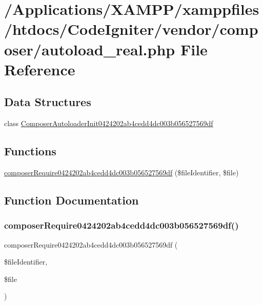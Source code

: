\hypertarget{autoload__real_8php}{}\section{/\+Applications/\+X\+A\+M\+P\+P/xamppfiles/htdocs/\+Code\+Igniter/vendor/composer/autoload\+\_\+real.php File Reference}
\label{autoload__real_8php}
\subsection*{Data Structures}
\begin{DoxyCompactItemize}
\item 
class \mbox{\hyperlink{class_composer_autoloader_init0424202ab4cedd4dc003b056527569df}{Composer\+Autoloader\+Init0424202ab4cedd4dc003b056527569df}}
\end{DoxyCompactItemize}
\subsection*{Functions}
\begin{DoxyCompactItemize}
\item 
\mbox{\hyperlink{autoload__real_8php_ae695bbcfcc1de46df9271ff51b3c2270}{composer\+Require0424202ab4cedd4dc003b056527569df}} (\$file\+Identifier, \$file)
\end{DoxyCompactItemize}


\subsection{Function Documentation}
\mbox{\label{autoload__real_8php_ae695bbcfcc1de46df9271ff51b3c2270}} 
\subsubsection{\texorpdfstring{composer\+Require0424202ab4cedd4dc003b056527569df()}{composerRequire0424202ab4cedd4dc003b056527569df()}}
{\footnotesize\ttfamily composer\+Require0424202ab4cedd4dc003b056527569df (\begin{DoxyParamCaption}\item[{}]{\$file\+Identifier,  }\item[{}]{\$file }\end{DoxyParamCaption})}

